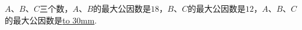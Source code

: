 $A$、$B$、$C$三个数，$A$、$B$的最大公因数是$18$，$B$、$C$的最大公因数是$12$，$A$、$B$、$C$的最大公因数是\underline{\hbox to 30mm{}}.


